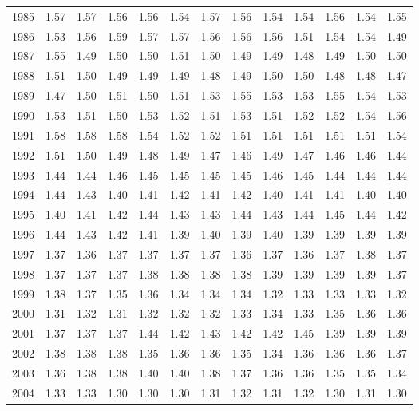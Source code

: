 \begin{longtable}{rrrrrrrrrrrrr}
  1985 & 1.57 & 1.57 & 1.56 & 1.56 & 1.54 & 1.57 & 1.56 & 1.54 & 1.54 & 1.56 & 1.54 & 1.55 \\ 
  1986 & 1.53 & 1.56 & 1.59 & 1.57 & 1.57 & 1.56 & 1.56 & 1.56 & 1.51 & 1.54 & 1.54 & 1.49 \\ 
  1987 & 1.55 & 1.49 & 1.50 & 1.50 & 1.51 & 1.50 & 1.49 & 1.49 & 1.48 & 1.49 & 1.50 & 1.50 \\ 
  1988 & 1.51 & 1.50 & 1.49 & 1.49 & 1.49 & 1.48 & 1.49 & 1.50 & 1.50 & 1.48 & 1.48 & 1.47 \\ 
  1989 & 1.47 & 1.50 & 1.51 & 1.50 & 1.51 & 1.53 & 1.55 & 1.53 & 1.53 & 1.55 & 1.54 & 1.53 \\ 
  1990 & 1.53 & 1.51 & 1.50 & 1.53 & 1.52 & 1.51 & 1.53 & 1.51 & 1.52 & 1.52 & 1.54 & 1.56 \\ 
  1991 & 1.58 & 1.58 & 1.58 & 1.54 & 1.52 & 1.52 & 1.51 & 1.51 & 1.51 & 1.51 & 1.51 & 1.54 \\ 
  1992 & 1.51 & 1.50 & 1.49 & 1.48 & 1.49 & 1.47 & 1.46 & 1.49 & 1.47 & 1.46 & 1.46 & 1.44 \\ 
  1993 & 1.44 & 1.44 & 1.46 & 1.45 & 1.45 & 1.45 & 1.45 & 1.46 & 1.45 & 1.44 & 1.44 & 1.44 \\ 
  1994 & 1.44 & 1.43 & 1.40 & 1.41 & 1.42 & 1.41 & 1.42 & 1.40 & 1.41 & 1.41 & 1.40 & 1.40 \\ 
  1995 & 1.40 & 1.41 & 1.42 & 1.44 & 1.43 & 1.43 & 1.44 & 1.43 & 1.44 & 1.45 & 1.44 & 1.42 \\ 
  1996 & 1.44 & 1.43 & 1.42 & 1.41 & 1.39 & 1.40 & 1.39 & 1.40 & 1.39 & 1.39 & 1.39 & 1.39 \\ 
  1997 & 1.37 & 1.36 & 1.37 & 1.37 & 1.37 & 1.37 & 1.36 & 1.37 & 1.36 & 1.37 & 1.38 & 1.37 \\ 
  1998 & 1.37 & 1.37 & 1.37 & 1.38 & 1.38 & 1.38 & 1.38 & 1.39 & 1.39 & 1.39 & 1.39 & 1.37 \\ 
  1999 & 1.38 & 1.37 & 1.35 & 1.36 & 1.34 & 1.34 & 1.34 & 1.32 & 1.33 & 1.33 & 1.33 & 1.32 \\ 
  2000 & 1.31 & 1.32 & 1.31 & 1.32 & 1.32 & 1.32 & 1.33 & 1.34 & 1.33 & 1.35 & 1.36 & 1.36 \\ 
  2001 & 1.37 & 1.37 & 1.37 & 1.44 & 1.42 & 1.43 & 1.42 & 1.42 & 1.45 & 1.39 & 1.39 & 1.39 \\ 
  2002 & 1.38 & 1.38 & 1.38 & 1.35 & 1.36 & 1.36 & 1.35 & 1.34 & 1.36 & 1.36 & 1.36 & 1.37 \\ 
  2003 & 1.36 & 1.38 & 1.38 & 1.40 & 1.40 & 1.38 & 1.37 & 1.36 & 1.36 & 1.35 & 1.35 & 1.34 \\ 
  2004 & 1.33 & 1.33 & 1.30 & 1.30 & 1.30 & 1.31 & 1.32 & 1.31 & 1.32 & 1.30 & 1.31 & 1.30 \\ 

\end{longtable}
